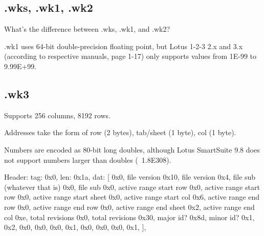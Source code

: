 \documentclass{article}
\begin{document}
\subsection{.wks, .wk1, .wk2}

What's the difference between .wks, .wk1, and .wk2?

.wk1 uses 64-bit double-precision floating point, but
Lotus 1-2-3 2.x and 3.x (according to respective manuals, page 1-17)
only supports values from 1E-99 to 9.99E+99.

\subsection{.wk3}
Supports 256 columns, 8192 rows.

Addresses take the form of row (2 bytes), tab/sheet (1 byte), col (1
byte).

Numbers are encoded as 80-bit long doubles,
although Lotus SmartSuite 9.8 does not support numbers larger
than doubles (~1.8E308).

Header:
                tag: 0x0,
                len: 0x1a,
                dat: [
                    0x0,  file version
                    0x10, file version
                    0x4, file sub (whatever that is)
                    0x0, file sub
                    0x0, active range start row
                    0x0, active range start row
                    0x0, active range start sheet
                    0x0, active range start col
                    0x6, active range end row
                    0x0, active range end row
                    0x0, active range end sheet
                    0x2, active range end col
                    0xe, total revisions
                    0x0, total revisions
                    0x30, major id?
                    0x8d, minor id?
                    0x1,
                    0x2,
                    0x0,
                    0x0,
                    0x0,
                    0x1,
                    0x0,
                    0x0,
                    0x0,
                    0x1,
                ],
\end{document}
